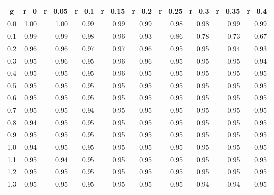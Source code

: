 %
\begin{table}[!tbp]
 \begin{center}
 \begin{tabular}{rrrrrrrrrr}\hline\hline
\multicolumn{1}{c}{g}&\multicolumn{1}{c}{r=0}&\multicolumn{1}{c}{r=0.05}&\multicolumn{1}{c}{r=0.1}&\multicolumn{1}{c}{r=0.15}&\multicolumn{1}{c}{r=0.2}&\multicolumn{1}{c}{r=0.25}&\multicolumn{1}{c}{r=0.3}&\multicolumn{1}{c}{r=0.35}&\multicolumn{1}{c}{r=0.4}\tabularnewline
\hline
0.0&1.00&1.00&0.99&0.99&0.99&0.98&0.98&0.99&0.99\tabularnewline
0.1&0.99&0.99&0.98&0.96&0.93&0.86&0.78&0.73&0.67\tabularnewline
0.2&0.96&0.96&0.97&0.97&0.96&0.95&0.95&0.94&0.93\tabularnewline
0.3&0.95&0.96&0.95&0.96&0.96&0.95&0.95&0.95&0.94\tabularnewline
0.4&0.95&0.95&0.95&0.96&0.95&0.95&0.95&0.95&0.95\tabularnewline
0.5&0.95&0.95&0.95&0.95&0.95&0.95&0.95&0.95&0.95\tabularnewline
0.6&0.95&0.95&0.95&0.95&0.95&0.95&0.95&0.95&0.95\tabularnewline
0.7&0.95&0.95&0.94&0.95&0.95&0.95&0.95&0.95&0.95\tabularnewline
0.8&0.94&0.95&0.95&0.95&0.95&0.95&0.95&0.95&0.95\tabularnewline
0.9&0.95&0.95&0.95&0.95&0.95&0.95&0.95&0.95&0.95\tabularnewline
1.0&0.94&0.95&0.95&0.95&0.95&0.95&0.95&0.95&0.95\tabularnewline
1.1&0.95&0.94&0.95&0.95&0.95&0.95&0.95&0.95&0.95\tabularnewline
1.2&0.95&0.95&0.95&0.95&0.95&0.95&0.95&0.95&0.95\tabularnewline
1.3&0.95&0.95&0.95&0.95&0.95&0.95&0.94&0.94&0.95\tabularnewline
\hline
\end{tabular}

\end{center}

\end{table}

